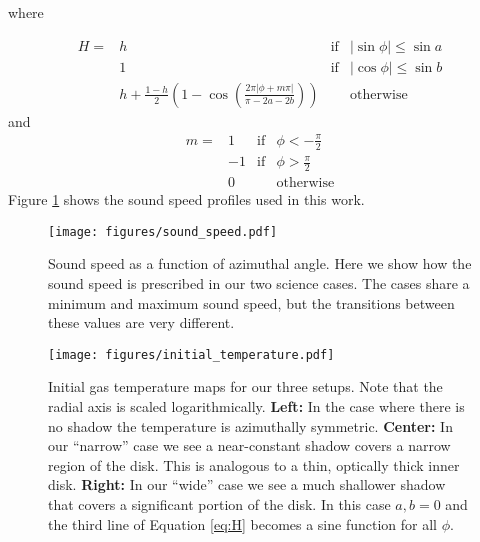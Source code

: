 \documentclass[twocolumn]{aastex631}
\begin{document}
where 

\begin{equation*}
    \label{eq:H}
    \begin{array}{cccc}
        H = & h & \text{if} & |\sin{\phi}| \le \sin{a}  \\
            & 1 & \text{if} & |\cos{\phi}| \le \sin{b} \\
            & h + \frac{1-h}{2} \left (  1-\cos{\left ( \frac{2 \pi | \phi + m\pi |}{\pi - 2a - 2b}  \right )  } \right ) & & \text{otherwise}
    \end{array}
\end{equation*}
and
\begin{equation}
    \begin{array}{cccc}
        m = & 1 & \text{if} & \phi < -\frac{\pi}{2} \\
            & -1 & \text{if} & \phi > \frac{\pi}{2} \\
            & 0 & & \text{otherwise}
    \end{array}
\end{equation}
Figure \ref{fig:cs} shows the sound speed profiles used in this work.

\begin{figure}
    \begin{center}
        \texttt{[image: figures/sound\_speed.pdf]}
        \caption{Sound speed as a function of azimuthal angle. Here we show how the sound speed is prescribed in our two science cases. The cases
        share a minimum and maximum sound speed, but the transitions between these values are very different.}    
    \end{center}
    \label{fig:cs}
\end{figure}


\begin{figure*}
    \texttt{[image: figures/initial\_temperature.pdf]}
    \caption{Initial gas temperature maps for our three setups. Note that the radial axis is scaled logarithmically. {\bf Left:} In the case where there is no shadow the temperature is azimuthally symmetric.
    {\bf Center:} In our ``narrow'' case we see a near-constant shadow covers a narrow region of the disk. This is analogous to a thin, optically thick inner disk.
    {\bf Right:} In our ``wide'' case we see a much shallower shadow that covers a significant portion of the disk. In this case $a,b=0$ and the third line of
    Equation \ref{eq:H} becomes a sine function for all $\phi$.
    }
    \label{fig:setup}
\end{figure*}
\end{document}
